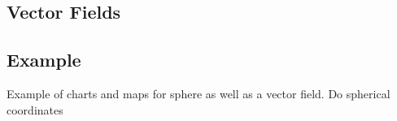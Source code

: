 \documentclass[UKenglish]{beamer}
\begin{document}
\subsection{Vector Fields}

\begin{frame}{}
\vfill
\begin{figure}[H]
	\centering
	\def\svgwidth{0.75\columnwidth}
	
\end{figure}
\vfill
\end{frame}

\begin{frame}{}
\vfill
\begin{figure}[H]
	\centering
	\def\svgwidth{0.75\columnwidth}
	
\end{figure}
\vfill
\end{frame}

\begin{frame}{}
\vfill
\begin{figure}[H]
	\centering
	\def\svgwidth{\columnwidth}
	
\end{figure}
\vfill
\end{frame}

\begin{frame}{}
\vfill
\begin{figure}[H]
	\centering
	\def\svgwidth{.75\columnwidth}
	
\end{figure}
\vfill
\end{frame}

\begin{frame}{}
\vfill
\begin{figure}[H]
	\centering
	\def\svgwidth{\columnwidth}
	
\end{figure}
\vfill
\end{frame}

\begin{frame}{}
\vfill
\begin{figure}[H]
	\centering
	\def\svgwidth{\columnwidth}
	
\end{figure}
\vfill
\end{frame}

\subsection{Example}

\begin{frame}{}
	Example of charts and maps for sphere as well as a vector field.  Do spherical coordinates
\end{frame}
\end{document}
